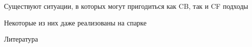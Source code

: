 \documentclass[11pt,aspectratio=169]{beamer}
\begin{document}
\begin{frame}

\begin{tcolorbox}[colback=info!5,colframe=info!80,title=]
Существуют ситуации, в которых могут пригодиться как CB, так и CF подходы
\end{tcolorbox}

\vfill

\begin{tcolorbox}[colback=info!5,colframe=info!80,title=]
Некоторые из них даже реализованы на спарке
\end{tcolorbox}

\end{frame}

\begin{frame}[allowframebreaks]{Литература}




\end{frame}
\end{document}
